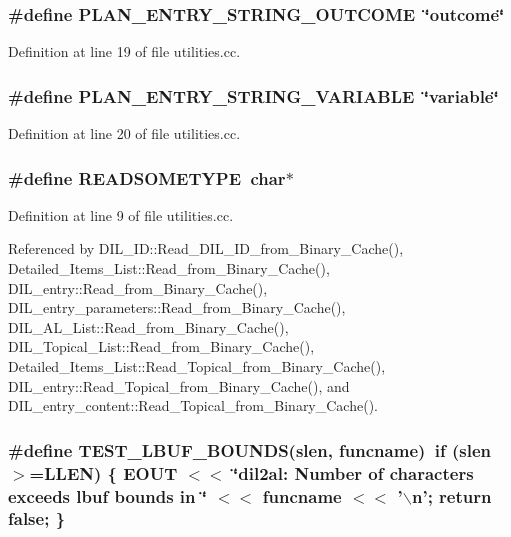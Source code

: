 \subsubsection{\setlength{\rightskip}{0pt plus 5cm}\#define PLAN\_\-ENTRY\_\-STRING\_\-OUTCOME\ \char`\"{}outcome\char`\"{}}\label{utilities_8cc_a8}




Definition at line 19 of file utilities.cc.
\subsubsection{\setlength{\rightskip}{0pt plus 5cm}\#define PLAN\_\-ENTRY\_\-STRING\_\-VARIABLE\ \char`\"{}variable\char`\"{}}\label{utilities_8cc_a9}




Definition at line 20 of file utilities.cc.
\subsubsection{\setlength{\rightskip}{0pt plus 5cm}\#define READSOMETYPE\ char$\ast$}\label{utilities_8cc_a0}




Definition at line 9 of file utilities.cc.

Referenced by DIL\_\-ID::Read\_\-DIL\_\-ID\_\-from\_\-Binary\_\-Cache(), Detailed\_\-Items\_\-List::Read\_\-from\_\-Binary\_\-Cache(), DIL\_\-entry::Read\_\-from\_\-Binary\_\-Cache(), DIL\_\-entry\_\-parameters::Read\_\-from\_\-Binary\_\-Cache(), DIL\_\-AL\_\-List::Read\_\-from\_\-Binary\_\-Cache(), DIL\_\-Topical\_\-List::Read\_\-from\_\-Binary\_\-Cache(), Detailed\_\-Items\_\-List::Read\_\-Topical\_\-from\_\-Binary\_\-Cache(), DIL\_\-entry::Read\_\-Topical\_\-from\_\-Binary\_\-Cache(), and DIL\_\-entry\_\-content::Read\_\-Topical\_\-from\_\-Binary\_\-Cache().
\subsubsection{\setlength{\rightskip}{0pt plus 5cm}\#define TEST\_\-LBUF\_\-BOUNDS(slen, funcname)\ if (slen$>$=LLEN) \{ EOUT $<$$<$ \char`\"{}dil2al: Number of characters exceeds lbuf bounds in \char`\"{} $<$$<$ funcname $<$$<$ '$\backslash$n'; return {\bf false}; \}}\label{utilities_8cc_a1}





